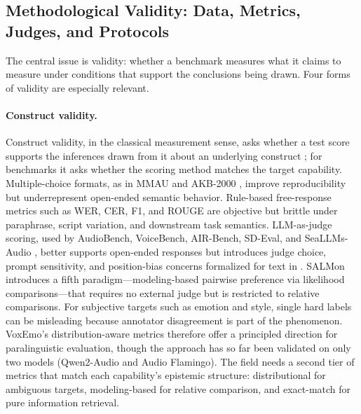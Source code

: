 \subsection{Methodological Validity: Data, Metrics, Judges, and Protocols}
\label{subsec:eval_validity}

The central issue is validity: whether a benchmark measures what it claims
to measure under conditions that support the conclusions being drawn. Four
forms of validity are especially relevant.

\paragraph{Construct validity.}
Construct validity, in the classical measurement sense, asks whether a
test score supports the inferences drawn from it about an underlying
construct \citep{messick1995validity}; for benchmarks it asks whether the
scoring method matches the target capability. Multiple-choice formats, as in MMAU and AKB-2000
\citep{sakshi2024mmau,lu2026akb2000}, improve reproducibility but
underrepresent open-ended semantic behavior. Rule-based free-response
metrics such as WER, CER, F1, and ROUGE are objective but brittle under
paraphrase, script variation, and downstream task semantics. LLM-as-judge
scoring, used by AudioBench, VoiceBench, AIR-Bench, SD-Eval, and
SeaLLMs-Audio
\citep{wang2025audiobench,chen2024voicebench,yang2024airbench,ao2024sdeval,liu2025seallmsaudio},
better supports open-ended responses but introduces judge choice, prompt
sensitivity, and position-bias concerns formalized for text in
\citep{zheng2023judging}. SALMon \citep{maimon2024salmon} introduces a fifth
paradigm---modeling-based pairwise preference via likelihood
comparisons---that requires no external judge but is restricted to
relative comparisons. For subjective targets such as emotion and style,
single hard labels can be misleading because annotator disagreement is
part of the phenomenon. VoxEmo's distribution-aware metrics
\citep{zhang2026voxemo} therefore offer a principled direction for
paralinguistic evaluation, though the approach has so far been validated
on only two models (Qwen2-Audio and Audio Flamingo). The field needs
a second tier of metrics that match each capability's epistemic structure:
distributional for ambiguous targets, modeling-based for relative
comparison, and exact-match for pure information retrieval.

